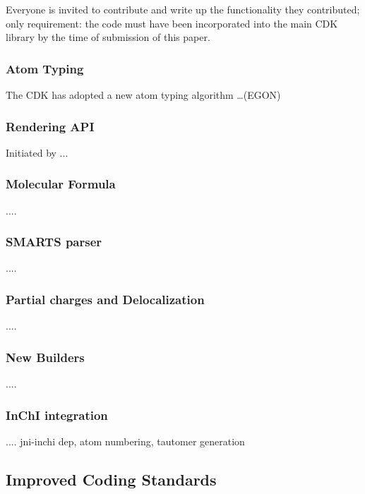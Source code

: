 \documentclass[10pt]{bmc_article}
\newenvironment{bmcformat}{\begin{raggedright}\baselineskip20pt\sloppy\setboolean{publ}{false}}{\end{raggedright}\baselineskip20pt\sloppy}
\begin{document}
\begin{bmcformat}
Everyone is invited to contribute and write up the functionality they contributed;
only requirement: the code must have been incorporated into the main CDK library by the
time of submission of this paper.

  \subsubsection*{Atom Typing}
  
  The CDK has adopted a new atom typing algorithm \ldots (EGON)

  \subsubsection*{Rendering API}
  
  Initiated by ...
  
  \subsubsection*{Molecular Formula}
  
  ....

  \subsubsection*{SMARTS parser}
  
  ....

  \subsubsection*{Partial charges and Delocalization}
  
  ....

  \subsubsection*{New Builders}
  
  ....

  \subsubsection*{InChI integration}
  
  .... jni-inchi dep, atom numbering, tautomer generation
  
\subsection*{Improved Coding Standards}


\end{bmcformat}
\end{document}
